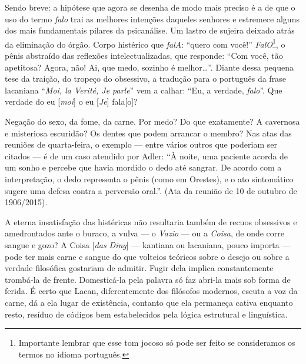Sendo breve: a hipótese que agora se desenha de modo mais preciso é a de
que o uso do termo \emph{falo} trai as melhores intenções daqueles
senhores e estremece alguns dos mais fundamentais pilares da
psicanálise. Um lastro de sujeira deixado atrás da eliminação do órgão.
Corpo histérico que \emph{falA}: ``quero com você!''
\emph{FalO}\footnote{Importante lembrar que esse tom jocoso só pode ser
  feito se consideramos os termos no idioma português.}, o pênis
abstraído das reflexões intelectualizadas, que responde: ``Com você, tão
apetitosa? Agora, não! Ai, que medo, sozinho é melhor\ldots{}''. Diante dessa
pequena tese da traição, do tropeço do obsessivo, a tradução para o
português da frase lacaniana ``\emph{Moi, la Verité, Je parle}'' vem a
calhar: ``Eu, a verdade, \emph{falo}''. Que verdade do eu
{[}\emph{moi}{]} o eu {[}\emph{Je}{]} fala{[}o{]}?

Negação do sexo, da fome, da carne. Por medo? Do que exatamente? A
cavernosa e misteriosa escuridão? Os dentes que podem arrancar o membro?
Nas atas das reuniões de quarta-feira, o exemplo --- entre vários outros
que poderiam ser citados --- é de um caso atendido por Adler: ``À noite,
uma paciente acorda de um sonho e percebe que havia mordido o dedo até
sangrar. De acordo com a interpretação, o dedo representa o pênis (como
em Orestes), e o ato sintomático sugere uma defesa contra a perversão
oral.''. (Ata da reunião de 10 de outubro de 1906/2015).

A eterna insatisfação das histéricas não resultaria também de recuos
obsessivos e amedrontados ante o buraco, a vulva --- o \emph{Vazio} --- ou
a \emph{Coisa}, de onde corre sangue e gozo? A Coisa {[}\emph{das
Ding}{]} --- kantiana ou lacaniana, pouco importa --- pode ter mais carne
e sangue do que volteios teóricos sobre o desejo ou sobre a verdade
filosófica gostariam de admitir. Fugir dela implica constantemente
trombá-la de frente. Domesticá-la pela palavra só faz abri-la mais sob
forma de ferida. É certo que Lacan, diferentemente dos filósofos
modernos, escuta a voz da carne, dá a ela lugar de existência, contanto
que ela permaneça cativa enquanto resto, resíduo de códigos bem
estabelecidos pela lógica estrutural e linguística.

